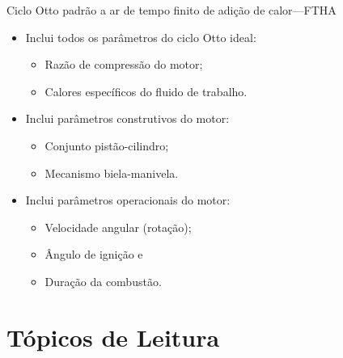     \begin{frame}{Ciclo Otto padrão a ar de tempo finito de adição de calor---FTHA}\vspace*{-2em}
        \begin{itemize}
            \item<1->  Inclui todos os parâmetros do \alert{ciclo Otto ideal}:
            \begin{itemize}
                \item<2->  \alert{Razão de compressão} do motor;
                \item<3->  \alert{Calores específicos} do fluido de trabalho.
            \end{itemize}
            \item<4->  Inclui parâmetros \alert{construtivos} do \alert{motor}:
            \begin{itemize}
                \item<5->  Conjunto \alert{pistão-cilindro};
                \item<6->  Mecanismo \alert{biela-manivela}.
            \end{itemize}
            \item<7->  Inclui parâmetros \alert{operacionais} do \alert{motor}:
            \begin{itemize}
                \item<8->  \alert{Velocidade angular} (rotação);
                \item<9->  Ângulo de \alert{ignição} e
                \item<10-> \alert{Duração da combustão}.
            \end{itemize}
        \end{itemize}
    \end{frame}

\section{Tópicos de Leitura}


